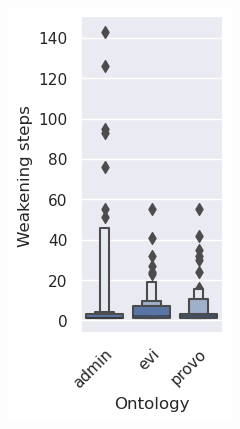 \begin{figure}[ht]
  \begin{widepage}
    \centering
    \begin{subfigure}[T]{0.175\textwidth}
      \includegraphics[width=\textwidth]{resources/steps-ontology-violin-1.png}
    \end{subfigure}
    \begin{subfigure}[T]{0.77\textwidth}

\end{subfigure}
\end{widepage}
\end{figure}
